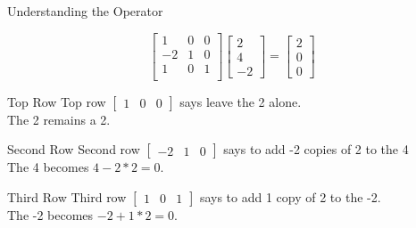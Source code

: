 \documentclass[10pt]{beamer}
\begin{document}
\begin{frame}{Understanding the Operator}
    
     $$\begin{bmatrix}
          1 & 0 & 0\\
        -2 & 1 & 0\\
        1 & 0 & 1\\
        \end{bmatrix} \begin{bmatrix}2 \\ 4 \\ -2\end{bmatrix} =
        \begin{bmatrix}
        2 \\ 0 \\ 0
        \end{bmatrix}$$ 

    \begin{block}{Top Row}
         Top row $\begin{bmatrix}
                1 & 0 & 0
            \end{bmatrix}$ says leave the 2 alone.\\
            The 2 remains a 2.
    \end{block}
    
    \begin{block}{Second Row}
            Second row $\begin{bmatrix}
                -2 & 1 & 0
            \end{bmatrix}$ says to add -2 copies of 2 to the 4\\
            The 4 becomes $4-2*2 = 0$.
    \end{block}

       \begin{block}{Third Row}
            Third row $\begin{bmatrix}
                1 & 0 & 1
            \end{bmatrix}$ says to add 1 copy of 2 to the -2.\\
            The -2 becomes $-2+1*2 = 0$.
    \end{block}
\end{frame}
\end{document}
